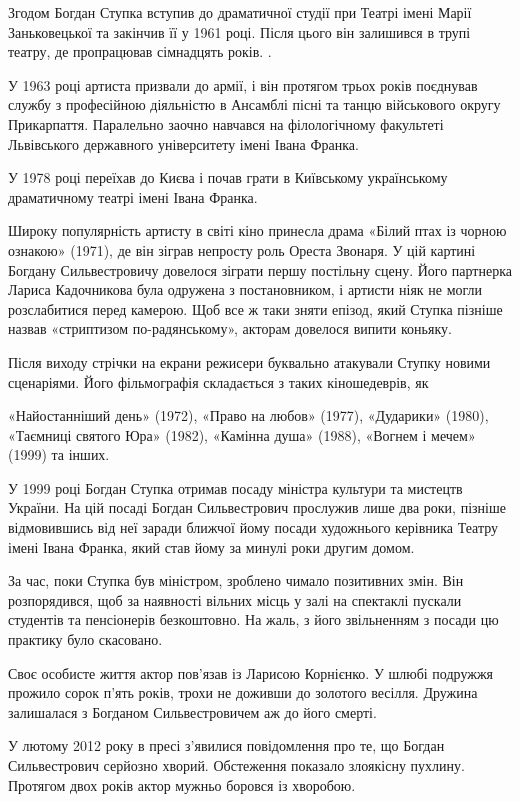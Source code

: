 Згодом Богдан Ступка вступив до драматичної студії при Театрі імені Марії
Заньковецької та закінчив її у 1961 році. Після цього він залишився в трупі
театру, де пропрацював сімнадцять років. .

У 1963 році артиста призвали до армії, і він протягом трьох років поєднував
службу з професійною діяльністю в Ансамблі пісні та танцю військового округу
Прикарпаття. Паралельно заочно навчався на філологічному факультеті Львівського
державного університету імені Івана Франка.

У 1978 році переїхав до Києва і почав грати в Київському українському
драматичному театрі імені Івана Франка.

Широку популярність артисту в світі кіно принесла драма «Білий птах із чорною
ознакою» (1971), де він зіграв непросту роль Ореста Звонаря. У цій картині
Богдану Сильвестровичу довелося зіграти першу постільну сцену. Його партнерка
Лариса Кадочникова була одружена з постановником, і артисти ніяк не могли
розслабитися перед камерою. Щоб все ж таки зняти епізод, який Ступка пізніше
назвав «стриптизом по-радянському», акторам довелося випити коньяку.

Після виходу стрічки на екрани режисери буквально атакували Ступку новими
сценаріями. Його фільмографія складається з таких кіношедеврів, як

«Найостанніший день» (1972), «Право на любов» (1977), «Дударики» (1980),
«Таємниці святого Юра» (1982), «Камінна душа» (1988), «Вогнем і мечем» (1999)
та інших.

У 1999 році Богдан Ступка отримав посаду міністра культури та мистецтв України.
На цій посаді Богдан Сильвестрович прослужив лише два роки, пізніше
відмовившись від неї заради ближчої йому посади художнього керівника Театру
імені Івана Франка, який став йому за минулі роки другим домом.

За час, поки Ступка був міністром, зроблено чимало позитивних змін. Він
розпорядився, щоб за наявності вільних місць у залі на спектаклі пускали
студентів та пенсіонерів безкоштовно. На жаль, з його звільненням з посади цю
практику було скасовано.

Своє особисте життя актор пов'язав із Ларисою Корнієнко. У шлюбі подружжя
прожило сорок п'ять років, трохи не доживши до золотого весілля. Дружина
залишалася з Богданом Сильвестровичем аж до його смерті.

У лютому 2012 року в пресі з'явилися повідомлення про те, що Богдан
Сильвестрович серйозно хворий. Обстеження показало злоякісну пухлину. Протягом
двох років актор мужньо боровся із хворобою.

